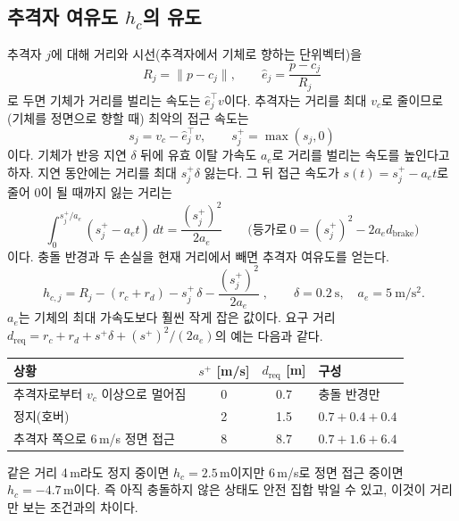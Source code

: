 \documentclass[10pt,a4paper]{article}
\begin{document}
\subsection{추격자 여유도 $h_c$의 유도}\label{sec:hc}
추격자 $j$에 대해 거리와 시선(추격자에서 기체로 향하는 단위벡터)을
\begin{equation}
R_j=\|p-c_j\|,\qquad \hat e_j=\frac{p-c_j}{R_j}
\end{equation}
로 두면 기체가 거리를 벌리는 속도는 $\hat e_j^\top v$이다. 추격자는 거리를 최대 $v_c$로 줄이므로(기체를 정면으로 향할 때) 최악의 접근 속도는
\begin{equation}
s_j=v_c-\hat e_j^\top v,\qquad s_j^+=\max(s_j,0)
\label{eq:closing}
\end{equation}
이다. 기체가 반응 지연 $\delta$ 뒤에 유효 이탈 가속도 $a_e$로 거리를 벌리는 속도를 높인다고 하자.
지연 동안에는 거리를 최대 $s_j^+\delta$ 잃는다. 그 뒤 접근 속도가 $s(t)=s_j^+-a_e t$로 줄어 0이 될 때까지 잃는 거리는
\begin{equation}
\int_0^{s_j^+/a_e}(s_j^+-a_e t)\,dt=\frac{(s_j^+)^2}{2a_e}
\qquad\Big(\text{등가로}\ 0=(s_j^+)^2-2a_e d_{\mathrm{brake}}\Big)
\end{equation}
이다. 충돌 반경과 두 손실을 현재 거리에서 빼면 추격자 여유도를 얻는다.
\begin{equation}
\boxed{\;h_{c,j}=R_j-(r_c+r_d)-s_j^+\,\delta-\frac{(s_j^+)^2}{2a_e}\;},\qquad \delta=0.2\ \mathrm s,\quad a_e=5\ \mathrm{m/s^2}.
\label{eq:hc}
\end{equation}
$a_e$는 기체의 최대 가속도보다 훨씬 작게 잡은 값이다. 요구 거리 $d_{\mathrm{req}}=r_c+r_d+s^+\delta+(s^+)^2/(2a_e)$의 예는 다음과 같다.

\begin{center}\small
\begin{tabular}{lccl}\toprule
상황 & $s^+$ [m/s] & $d_{\mathrm{req}}$ [m] & 구성 \\\midrule
추격자로부터 $v_c$ 이상으로 멀어짐 & 0 & 0.7 & 충돌 반경만 \\
정지(호버) & 2 & 1.5 & $0.7+0.4+0.4$ \\
추격자 쪽으로 6\,m/s 정면 접근 & 8 & 8.7 & $0.7+1.6+6.4$ \\\bottomrule
\end{tabular}
\end{center}

\noindent
같은 거리 4\,m라도 정지 중이면 $h_c=2.5$\,m이지만 6\,m/s로 정면 접근 중이면 $h_c=-4.7$\,m이다.
즉 아직 충돌하지 않은 상태도 안전 집합 밖일 수 있고, 이것이 거리만 보는 조건과의 차이다.
\end{document}
